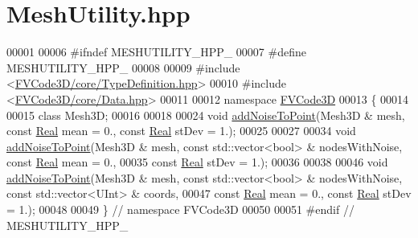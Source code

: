 \hypertarget{MeshUtility_8hpp_source}{}\section{Mesh\+Utility.\+hpp}
\label{MeshUtility_8hpp_source}

\begin{DoxyCode}
00001 
00006 \textcolor{preprocessor}{#ifndef MESHUTILITY\_HPP\_}
00007 \textcolor{preprocessor}{#define MESHUTILITY\_HPP\_}
00008 
00009 \textcolor{preprocessor}{#include <\hyperlink{TypeDefinition_8hpp}{FVCode3D/core/TypeDefinition.hpp}>}
00010 \textcolor{preprocessor}{#include <\hyperlink{Data_8hpp}{FVCode3D/core/Data.hpp}>}
00011 
00012 \textcolor{keyword}{namespace }\hyperlink{namespaceFVCode3D}{FVCode3D}
00013 \{
00014 
00015 \textcolor{keyword}{class }Mesh3D;
00016 
00018 
00024 \textcolor{keywordtype}{void} \hyperlink{namespaceFVCode3D_a9f604a7093f7f7323727e7ba28d8ce75}{addNoiseToPoint}(Mesh3D & mesh, \textcolor{keyword}{const} \hyperlink{namespaceFVCode3D_a40c1f5588a248569d80aa5f867080e83}{Real} mean = 0., \textcolor{keyword}{const} 
      \hyperlink{namespaceFVCode3D_a40c1f5588a248569d80aa5f867080e83}{Real} stDev = 1.);
00025 
00027 
00034 \textcolor{keywordtype}{void} \hyperlink{namespaceFVCode3D_a9f604a7093f7f7323727e7ba28d8ce75}{addNoiseToPoint}(Mesh3D & mesh, \textcolor{keyword}{const} std::vector<bool> & nodesWithNoise, \textcolor{keyword}{const} 
      \hyperlink{namespaceFVCode3D_a40c1f5588a248569d80aa5f867080e83}{Real} mean = 0.,
00035     \textcolor{keyword}{const} \hyperlink{namespaceFVCode3D_a40c1f5588a248569d80aa5f867080e83}{Real} stDev = 1.);
00036 
00038 
00046 \textcolor{keywordtype}{void} \hyperlink{namespaceFVCode3D_a9f604a7093f7f7323727e7ba28d8ce75}{addNoiseToPoint}(Mesh3D & mesh, \textcolor{keyword}{const} std::vector<bool> & nodesWithNoise, \textcolor{keyword}{const} 
      std::vector<UInt> & coords,
00047     \textcolor{keyword}{const} \hyperlink{namespaceFVCode3D_a40c1f5588a248569d80aa5f867080e83}{Real} mean = 0., \textcolor{keyword}{const} \hyperlink{namespaceFVCode3D_a40c1f5588a248569d80aa5f867080e83}{Real} stDev = 1.);
00048 
00049 \} \textcolor{comment}{// namespace FVCode3D}
00050 
00051 \textcolor{preprocessor}{#endif // MESHUTILITY\_HPP\_}
\end{DoxyCode}
